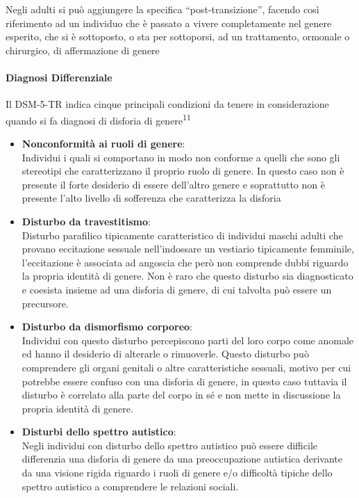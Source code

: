 \documentclass[12pt]{article}
\makeatletter
\newcommand{\cslcitation}[2]
 {\protect\hyper@linkstart{cite}{citeproc_bib_item_#1}#2\hyper@linkend}
\makeatother
\begin{document}
Negli adulti si può aggiungere la specifica ``post-transizione'', facendo così riferimento ad un individuo che è passato a vivere completamente nel genere esperito, che si è sottoposto, o sta per sottoporsi, ad un trattamento, ormonale o chirurgico, di affermazione di genere
\paragraph{Diagnosi Differenziale}
\label{sec:org834ee2d}
Il DSM-5-TR indica cinque principali condizioni da tenere in considerazione quando si fa diagnosi di disforia di genere\textsuperscript{\cslcitation{11}{11}}

\begin{itemize}
\item \textbf{Nonconformità ai ruoli di genere}: \\
Individui i quali si comportano in modo non conforme a quelli che sono gli stereotipi che caratterizzano il proprio ruolo di genere. In questo caso non è presente il forte desiderio di essere dell'altro genere e soprattutto non è presente l'alto livello di sofferenza che caratterizza la disforia

\item \textbf{Disturbo da travestitismo}: \\
Disturbo parafilico tipicamente caratteristico di individui maschi adulti che provano eccitazione sessuale nell'indossare un vestiario tipicamente femminile, l'eccitazione è associata ad angoscia che però non comprende dubbi riguardo la propria identità di genere.
Non è raro che questo disturbo sia diagnosticato e coesista insieme ad una disforia di genere, di cui talvolta può essere un precursore.

\item \textbf{Disturbo da dismorfismo corporeo}: \\
Individui con questo disturbo percepiscono parti del loro corpo come anomale ed hanno il desiderio di alterarle o rimuoverle.
Questo disturbo può comprendere gli organi genitali o altre caratteristiche sessuali, motivo per cui potrebbe essere confuso con una disforia di genere, in questo caso tuttavia il disturbo è correlato alla parte del corpo in sé e non mette in discussione la propria identità di genere.
\end{itemize}


\begin{itemize}
\item \textbf{Disturbi dello spettro autistico}: \\
Negli individui con disturbo dello spettro autistico può essere difficile differenzia una disforia di genere da una preoccupazione autistica derivante da una visione rigida riguardo i ruoli di genere e/o difficoltà tipiche dello spettro autistico a comprendere le relazioni sociali.
\end{itemize}
\end{document}
